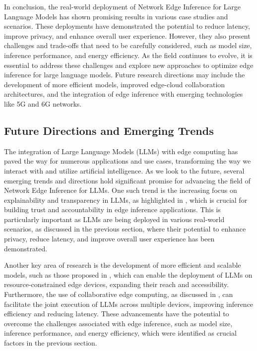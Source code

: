 \documentclass[11pt,a4paper]{article}
\begin{document}
In conclusion, the real-world deployment of Network Edge Inference for Large Language Models has shown promising results in various case studies and scenarios. These deployments have demonstrated the potential to reduce latency, improve privacy, and enhance overall user experience. However, they also present challenges and trade-offs that need to be carefully considered, such as model size, inference performance, and energy efficiency. As the field continues to evolve, it is essential to address these challenges and explore new approaches to optimize edge inference for large language models. Future research directions may include the development of more efficient models, improved edge-cloud collaboration architectures, and the integration of edge inference with emerging technologies like 5G and 6G networks.


\subsection{Future Directions and Emerging Trends}


The integration of Large Language Models (LLMs) with edge computing has paved the way for numerous applications and use cases, transforming the way we interact with and utilize artificial intelligence. As we look to the future, several emerging trends and directions hold significant promise for advancing the field of Network Edge Inference for LLMs. One such trend is the increasing focus on explainability and transparency in LLMs, as highlighted in \cite{doi:10.1109/access.2024.3351308}, which is crucial for building trust and accountability in edge inference applications. This is particularly important as LLMs are being deployed in various real-world scenarios, as discussed in the previous section, where their potential to enhance privacy, reduce latency, and improve overall user experience has been demonstrated.

Another key area of research is the development of more efficient and scalable models, such as those proposed in \cite{arxiv:2410.00531}, which can enable the deployment of LLMs on resource-constrained edge devices, expanding their reach and accessibility. Furthermore, the use of collaborative edge computing, as discussed in \cite{arxiv:2405.14371}, can facilitate the joint execution of LLMs across multiple devices, improving inference efficiency and reducing latency. These advancements have the potential to overcome the challenges associated with edge inference, such as model size, inference performance, and energy efficiency, which were identified as crucial factors in the previous section.
\end{document}
